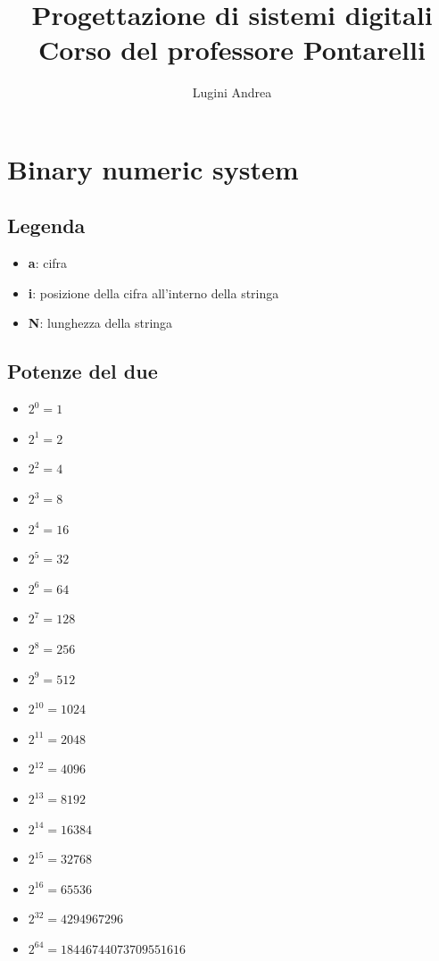 \documentclass{report}
\title{%
    Progettazione di sistemi digitali \\    
    \large Corso del professore Pontarelli
}
\author{Lugini Andrea}
\begin{document}
\maketitle
\tableofcontents
\newpage
\section{Binary numeric system}
    \subsection{Legenda}
        \begin{itemize}
            \item \textbf{a}: cifra
            \item \textbf{i}: posizione della cifra all'interno della stringa
            \item \textbf{N}: lunghezza della stringa
        \end{itemize}
    \subsection{Potenze del due}
        \begin{itemize}
            \item $2^0 = 1$
            \item $2^1 = 2$
            \item $2^2 = 4$
            \item $2^3 = 8$
            \item $2^4 = 16$
            \item $2^5 = 32$
            \item $2^6 = 64$
            \item $2^7 = 128$
            \item $2^8 = 256$
            \item $2^9 = 512$
            \item $2^{10} = 1024$
            \item $2^{11} = 2048$
            \item $2^{12} = 4096$
            \item $2^{13} = 8192$
            \item $2^{14} = 16384$
            \item $2^{15} = 32768$
            \item $2^{16} = 65536$
            \item $2^{32} = 4294967296$
            \item $2^{64} = 18446744073709551616$
        \end{itemize}
\end{document}
